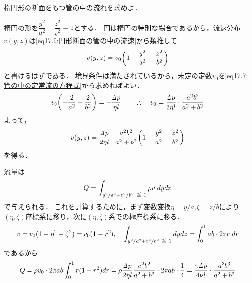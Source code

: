 \begin{mondai}{}{}
楕円形の断面をもつ管の中の流れを求めよ．
\end{mondai}
\begin{kaitou}
楕円の形を$\dfrac{y^2}{a^2}+\dfrac{z^2}{b^2}=1$とする．
円は楕円の特別な場合であるから，流速分布$v(y,z)$は\eqref{eq17.9:円形断面の管の中の流速}から類推して
\[
    v(y,z) = v_0 \pqty{1-\dfrac{y^2}{a^2}-\dfrac{z^2}{b^2}}
\]
と書けるはずである．
境界条件は満たされているから，未定の定数$v_0$を\eqref{eq17.7:管の中の定常流の方程式}から求めればよい．
\[
    v_0 \pqty{ -\frac{2}{a^2}-\frac{2}{b^2} } = -\frac{\D p}{\eta l}
    \qquad\yueni v_0 = \frac{\D p}{2\eta l} \cdot \frac{a^2b^2}{a^2+b^2}
\]
よって，
\[
    v(y,z) = \frac{\D p}{2\eta l} \cdot \frac{a^2b^2}{a^2+b^2} \pqty{1-\dfrac{y^2}{a^2}-\dfrac{z^2}{b^2}}
\]
を得る．


流量は
\[
    Q = \int_{y^2/a^2+z^2/b^2\ika1} \rho v \; dydz
\]
で与えられる．
これを計算するために，まず変数変換$\eta=y/a, \zeta=z/b$により$(\eta,\zeta)$座標系に移り，次に$(\eta,\zeta)$系での極座標系に移る．
\[
    v = v_0 (1-\eta^2-\zeta^2) = v_0(1-r^2), \quad
    \int_{y^2/a^2+z^2/b^2\ika1} dydz = \int_0^1 ab\cdot 2\pi r \; dr
\]
であるから
\[
    Q = \rho v_0 \cdot 2\pi ab \int_0^1 r(1-r^2)dr
    = \rho \frac{\D p}{2\eta l} \frac{a^2b^2}{a^2+b^2} \cdot 2\pi ab \cdot \frac{1}{4}
    = \frac{\pi\D p}{4\nu l} \cdot \frac{a^3b^3}{a^2+b^2} 
\]

    
\end{kaitou}








